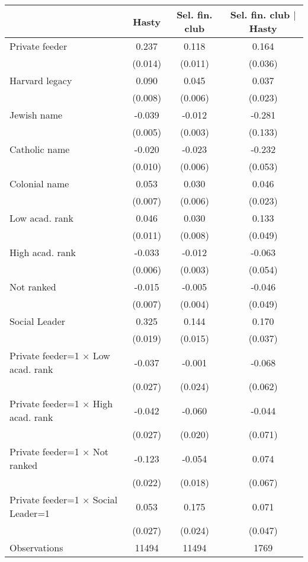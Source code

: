 \begin{tabular}{l*{3}{c}}
\toprule
                    &\multicolumn{1}{c}{Hasty}&\multicolumn{1}{c}{Sel. fin. club}&\multicolumn{1}{c}{Sel. fin. club $|$ Hasty}\\
\midrule
Private feeder      &       0.237&       0.118&       0.164\\
                    &     (0.014)&     (0.011)&     (0.036)\\
Harvard legacy      &       0.090&       0.045&       0.037\\
                    &     (0.008)&     (0.006)&     (0.023)\\
Jewish name         &      -0.039&      -0.012&      -0.281\\
                    &     (0.005)&     (0.003)&     (0.133)\\
Catholic name       &      -0.020&      -0.023&      -0.232\\
                    &     (0.010)&     (0.006)&     (0.053)\\
Colonial name       &       0.053&       0.030&       0.046\\
                    &     (0.007)&     (0.006)&     (0.023)\\
Low acad. rank      &       0.046&       0.030&       0.133\\
                    &     (0.011)&     (0.008)&     (0.049)\\
High acad. rank     &      -0.033&      -0.012&      -0.063\\
                    &     (0.006)&     (0.003)&     (0.054)\\
Not ranked          &      -0.015&      -0.005&      -0.046\\
                    &     (0.007)&     (0.004)&     (0.049)\\
Social Leader       &       0.325&       0.144&       0.170\\
                    &     (0.019)&     (0.015)&     (0.037)\\
Private feeder=1 $\times$ Low acad. rank&      -0.037&      -0.001&      -0.068\\
                    &     (0.027)&     (0.024)&     (0.062)\\
Private feeder=1 $\times$ High acad. rank&      -0.042&      -0.060&      -0.044\\
                    &     (0.027)&     (0.020)&     (0.071)\\
Private feeder=1 $\times$ Not ranked&      -0.123&      -0.054&       0.074\\
                    &     (0.022)&     (0.018)&     (0.067)\\
Private feeder=1 $\times$ Social Leader=1&       0.053&       0.175&       0.071\\
                    &     (0.027)&     (0.024)&     (0.047)\\
\midrule
Observations        &       11494&       11494&        1769\\
\bottomrule
\end{tabular}
